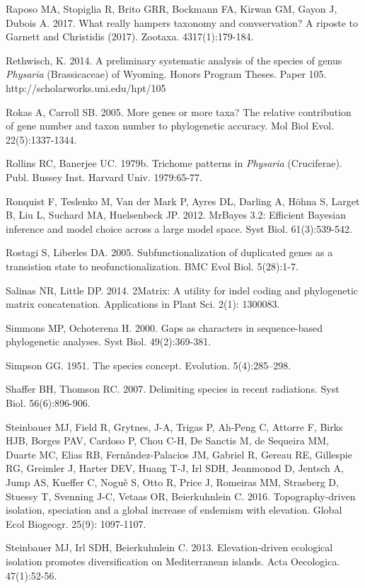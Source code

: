 Raposo MA, Stopiglia R, Brito GRR, Bockmann FA, Kirwan GM, Gayon J, Dubois A. 2017. What really hampers taxonomy and convservation? A riposte to Garnett and Christidis (2017). Zootaxa. 4317(1):179-184.

Rethwisch, K. 2014. A preliminary systematic analysis of the species of genus \textit{Physaria} (Brassicaceae) of Wyoming. Honors Program Theses. Paper 105.
http://scholarworks.uni.edu/hpt/105

Rokas A, Carroll SB. 2005. More genes or more taxa? The relative contribution of gene number and taxon number to phylogenetic accuracy. Mol Biol Evol. 22(5):1337-1344.

Rollins RC, Banerjee UC. 1979b. Trichome patterns in \textit{Physaria} (Cruciferae). Publ. Bussey Inst. Harvard Univ. 1979:65-77.

Ronquist F, Teslenko M, Van der Mark P, Ayres DL, Darling A, Höhna S, Larget B, Liu L, Suchard MA, Huelsenbeck JP. 2012. MrBayes 3.2: Efficient Bayesian inference and model choice across a large model space. Syst Biol. 61(3):539-542.

Rostagi S, Liberles DA. 2005. Subfunctionalization of duplicated genes as a transistion state to neofunctionalization. BMC Evol Biol. 5(28):1-7.

Salinas NR, Little DP. 2014. 2Matrix: A utility for indel coding and phylogenetic matrix concatenation. Applications in Plant Sci. 2(1): 1300083.

Simmons MP, Ochoterena H. 2000. Gaps as characters in sequence-based phylogenetic analyses. Syst Biol. 49(2):369-381.

Simpson GG. 1951. The species concept. Evolution. 5(4):285–298.

Shaffer BH, Thomson RC. 2007. Delimiting species in recent radiations. Syst Biol. 56(6):896-906.

Steinbauer MJ, Field R, Grytnes, J-A, Trigas P, Ah-Peng C, Attorre F, Birks HJB, Borges PAV, Cardoso P, Chou C-H, De Sanctis M, de Sequeira MM,  Duarte MC, Elias RB, Fern\v{a}ndez-Palacios JM, Gabriel R, Gereau RE, Gillespie RG, Greimler J, Harter DEV, Huang T-J, Irl SDH, Jeanmonod D, Jentsch A, Jump AS, Kueffer C, Nogu\v{e} S, Otto R, Price J, Romeiras MM, Strasberg D, Stuessy T, Svenning J-C, Vetaas OR, Beierkuhnlein C. 2016. Topography-driven isolation, speciation and a global increase of endemism with elevation. Global Ecol Biogeogr. 25(9): 1097-1107.

Steinbauer MJ, Irl SDH, Beierkuhnlein C. 2013. Elevation-driven ecological isolation promotes diversification on Mediterranean islands. Acta Oecologica. 47(1):52-56.



